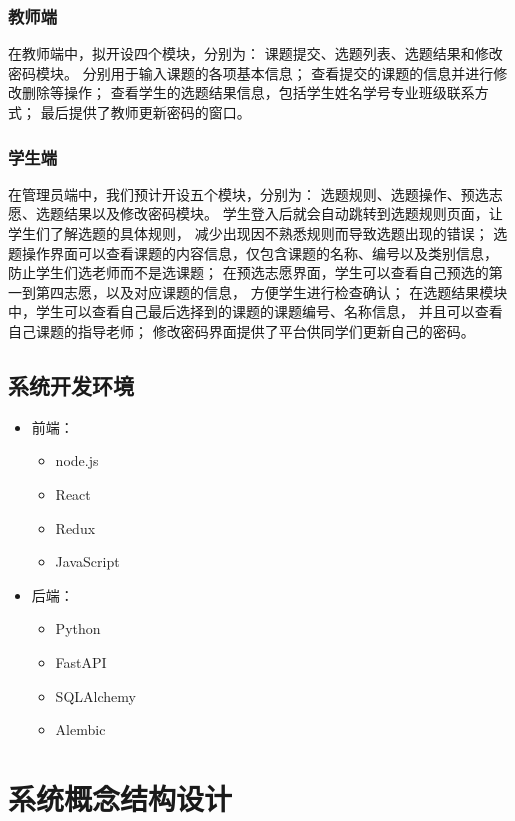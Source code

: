\subsubsection{教师端}
在教师端中，拟开设四个模块，分别为：
课题提交、选题列表、选题结果和修改密码模块。
分别用于输入课题的各项基本信息；
查看提交的课题的信息并进行修改删除等操作；
查看学生的选题结果信息，包括学生姓名学号专业班级联系方式；
最后提供了教师更新密码的窗口。

\subsubsection{学生端}
在管理员端中，我们预计开设五个模块，分别为：
选题规则、选题操作、预选志愿、选题结果以及修改密码模块。
学生登入后就会自动跳转到选题规则页面，让学生们了解选题的具体规则，
减少出现因不熟悉规则而导致选题出现的错误；
选题操作界面可以查看课题的内容信息，仅包含课题的名称、编号以及类别信息，
防止学生们选老师而不是选课题；
在预选志愿界面，学生可以查看自己预选的第一到第四志愿，以及对应课题的信息，
方便学生进行检查确认；
在选题结果模块中，学生可以查看自己最后选择到的课题的课题编号、名称信息，
并且可以查看自己课题的指导老师；
修改密码界面提供了平台供同学们更新自己的密码。


\subsection{系统开发环境}

\begin{itemize}
    \item 前端：
          \begin{itemize}
              \item node.js
              \item React
              \item Redux
              \item JavaScript
          \end{itemize}
    \item 后端：
          \begin{itemize}
              \item Python
              \item FastAPI
              \item SQLAlchemy
              \item Alembic
          \end{itemize}
\end{itemize}


\section{系统概念结构设计}


